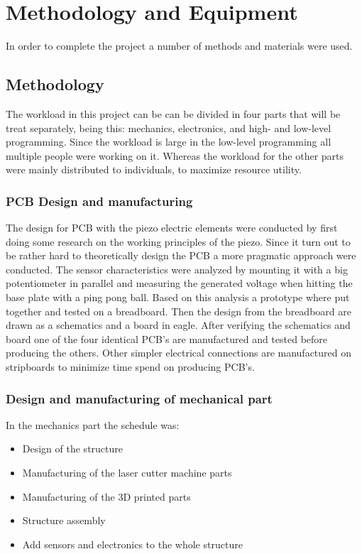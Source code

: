 \chapter{Methodology and Equipment}
\label{chap:methodology}
	In order to complete the project a number of methods and materials were used.
	
	\section{Methodology}
	\label{sec:methodology}
		The workload in this project can be can be divided in four parts that will be treat separately, being this: mechanics, electronics, and high- and low-level programming. 
		Since the workload is large in the low-level programming all multiple people were working on it. 
		Whereas the workload for the other parts were mainly distributed to individuals, to maximize resource utility.   
		
		\subsection{PCB Design and manufacturing}
			The design for PCB with the piezo electric elements were conducted by first doing some research on the working principles of the piezo. Since it turn out to be rather hard to theoretically design the PCB  a more pragmatic approach were conducted. 
			The sensor characteristics were analyzed by mounting it with a big potentiometer in parallel and measuring the generated voltage when hitting the base plate with a ping pong ball.
			Based on this analysis a prototype where put together and tested on a breadboard. 
			Then the design from the breadboard are drawn as a schematics and a board in eagle. 
			After verifying the schematics and board one of the four identical PCB's are manufactured and tested before producing the others.
			Other simpler electrical connections are manufactured on stripboards to minimize time spend on producing PCB's.
		
		\subsection{Design and manufacturing of mechanical part}
			In the mechanics part the schedule was:
			\begin{itemize}
				\item Design of the structure
				\item Manufacturing of the laser cutter machine parts
				\item Manufacturing of the 3D printed parts
				\item Structure assembly
				\item Add sensors and electronics to the whole structure
			\end{itemize}
			
